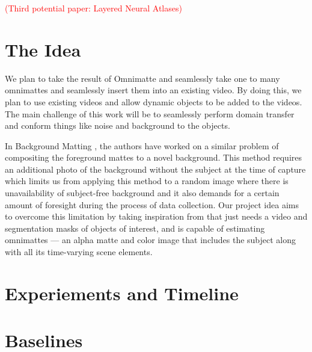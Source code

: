 \documentclass{article}
\begin{document}
\textcolor{red}{(Third potential paper: Layered Neural Atlases)}

\section{The Idea}
We plan to take the result of Omnimatte and seamlessly take one to many omnimattes and seamlessly insert them into an existing video. By doing this, we plan to use existing videos and allow dynamic objects to be added to the videos. The main challenge of this work will be to seamlessly perform domain transfer and conform things like noise and background to the objects.

In Background Matting \cite{BMSengupta20}, the authors have worked on a similar problem of compositing the foreground mattes to a novel background.  This method requires an additional photo of the background without the subject at the time of capture which limits us from applying this method to a random image where there is unavailability of subject-free background and it also demands for a certain amount of foresight during the process of data collection. Our project idea aims to overcome this limitation by taking inspiration from \cite{lu2021} that just needs a video and segmentation masks of objects of interest, and is capable of estimating omnimattes — an alpha matte and color image that includes the subject along with all its time-varying scene elements.

\section{Experiements and Timeline}

\section{Baselines}


\printbibliography
\end{document}

